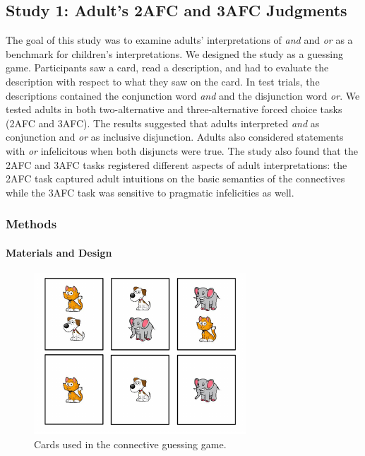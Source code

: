 \documentclass[floatsintext,man]{apa6}
\theoremstyle{definition}
\theoremstyle{definition}
\theoremstyle{definition}
\theoremstyle{remark}
\begin{document}
\subsection{Study 1: Adult's 2AFC and 3AFC
Judgments}\label{study-1-adults-2afc-and-3afc-judgments}

The goal of this study was to examine adults' interpretations of
\emph{and} and \emph{or} as a benchmark for children's interpretations.
We designed the study as a guessing game. Participants saw a card, read
a description, and had to evaluate the description with respect to what
they saw on the card. In test trials, the descriptions contained the
conjunction word \emph{and} and the disjunction word \emph{or}. We
tested adults in both two-alternative and three-alternative forced
choice tasks (2AFC and 3AFC). The results suggested that adults
interpreted \emph{and} as conjunction and \emph{or} as inclusive
disjunction. Adults also considered statements with \emph{or}
infelicitous when both disjuncts were true. The study also found that
the 2AFC and 3AFC tasks registered different aspects of adult
interpretations: the 2AFC task captured adult intuitions on the basic
semantics of the connectives while the 3AFC task was sensitive to
pragmatic infelicities as well.

\subsubsection{Methods}\label{methods}

\paragraph{Materials and Design}\label{materials-and-design}

\begin{figure}[!h]

{\centering \includegraphics{figs/stimuli-1} 

}

\caption{Cards used in the connective guessing game.}\label{fig:stimuli}
\end{figure}
\end{document}
